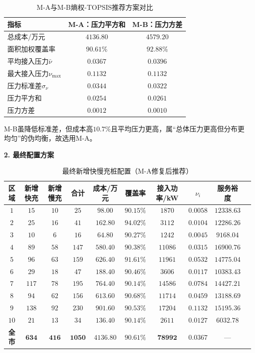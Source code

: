 \documentclass[a4paper,12pt]{ctexart}
\begin{document}
\begin{table}[H]
\centering
\caption{M-A与M-B熵权-TOPSIS推荐方案对比}
\begin{tabular}{lcc}
\toprule
指标 & M-A：压力平方和 & M-B：压力方差 \\
\midrule
总成本/万元 & $\mathbf{4136.80}$ & $4579.20$ \\
面积加权覆盖率 & $90.61\%$ & $\mathbf{92.88\%}$ \\
平均接入压力$\bar{\nu}$ & $\mathbf{0.0367}$ & $0.0396$ \\
最大接入压力$\nu_{\max}$ & $0.1132$ & $0.1132$ \\
压力标准差$\sigma_{\nu}$ & $0.0344$ & $\mathbf{0.0322}$ \\
压力平方和 & $\mathbf{0.0254}$ & $0.0261$ \\
压力方差 & $0.0012$ & $\mathbf{0.0010}$ \\
\bottomrule
\end{tabular}
\end{table}

M-B虽降低标准差，但成本高$10.7\%$且平均压力更高，属“总体压力更高但分布更均匀”的伪均衡，故选用M-A。


\textbf{2. 最终配置方案}

\begin{table}[H]
\centering
\caption{最终新增快慢充桩配置（M-A修复后推荐）}
\begin{tabular}{cccccccccc}
\toprule
区域 & 新增快充 & 新增慢充 & 合计 & 成本/万元 & 覆盖率 & 接入功率/kW & $\nu_{i}$ & 服务裕度 \\
\midrule
$1$ & $15$ & $10$ & $25$ & $98.00$ & $90.15\%$ & $1870$ & $0.0058$ & $12338.63$ \\
$2$ & $25$ & $16$ & $41$ & $162.80$ & $94.02\%$ & $3112$ & $0.0104$ & $12286.26$ \\
$3$ & $10$ & $6$ & $16$ & $64.80$ & $90.27\%$ & $1242$ & $0.0045$ & $9168.04$ \\
$4$ & $89$ & $58$ & $147$ & $580.40$ & $90.38\%$ & $11086$ & $0.0315$ & $16900.76$ \\
$5$ & $96$ & $63$ & $159$ & $626.40$ & $91.61\%$ & $11961$ & $0.0532$ & $14775.04$ \\
$6$ & $29$ & $18$ & $47$ & $188.40$ & $90.46\%$ & $3606$ & $0.0117$ & $10383.43$ \\
$7$ & $117$ & $78$ & $195$ & $764.40$ & $90.14\%$ & $14586$ & $0.0784$ & $14427.21$ \\
$8$ & $94$ & $62$ & $156$ & $613.60$ & $90.68\%$ & $11714$ & $0.0459$ & $13188.69$ \\
$9$ & $138$ & $92$ & $230$ & $901.60$ & $90.53\%$ & $17204$ & $0.1132$ & $15195.36$ \\
$10$ & $21$ & $13$ & $34$ & $136.40$ & $90.14\%$ & $2611$ & $0.0127$ & $6032.78$ \\
\midrule
\textbf{全市} & $\mathbf{634}$ & $\mathbf{416}$ & $\mathbf{1050}$ & $\mathbf{4136.80}$ & $\mathbf{90.61\%}$ & $\mathbf{78992}$ & $\mathbf{0.0367}$ & --- \\
\bottomrule
\end{tabular}
\end{table}
\end{document}
